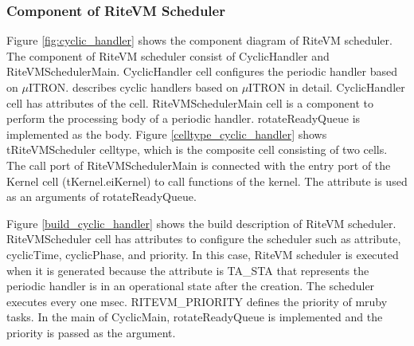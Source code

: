 \documentclass{sig-alternate-05-2015}
\begin{document}
\subsubsection{Component of RiteVM Scheduler}
Figure \ref{fig:cyclic_handler} shows the component diagram of RiteVM scheduler.
The component of RiteVM scheduler consist of CyclicHandler and RiteVMSchedulerMain.
CyclicHandler {\myit cell} configures the periodic handler based on $\mu$ITRON.
\cite{par:microITRON} describes cyclic handlers based on $\mu$ITRON in detail.
CyclicHandler {\myit cell} has attributes of the {\myit cell}.
RiteVMSchedulerMain {\myit cell} is a component to perform the processing body of a periodic handler.
{\myit rotateReadyQueue} is implemented as the body.
Figure \ref{celltype_cyclic_handler} shows tRiteVMScheduler {\myit celltype}, which is the {\myit composite cell} consisting of two {\myit cell}s.
The {\myit call} port of RiteVMSchedulerMain is connected with the {\myit entry} port of the Kernel {\myit cell} ({\myit tKernel.eiKernel}) to call functions of the kernel. 
The attribute is used as an arguments of {\myit rotateReadyQueue}.

Figure \ref{build_cyclic_handler} shows the build description of RiteVM scheduler.
RiteVMScheduler {\myit cell} has attributes to configure the scheduler such as attribute, cyclicTime, cyclicPhase, and priority.
In this case, RiteVM scheduler is executed when it is generated because the attribute is {\myit TA\_STA} that represents the periodic handler is in an operational state after the creation.
The scheduler executes every one msec.
RITEVM\_PRIORITY defines the priority of mruby tasks.
In the main of CyclicMain, {\myit rotateReadyQueue} is implemented and the priority is passed as the argument.
\end{document}
